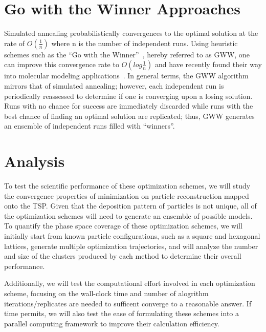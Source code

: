 \documentclass[10pt,twocolumn,notitlepage]{article}
\begin{document}
\section{Go with the Winner Approaches}
Simulated annealing probabilistically convergences to the optimal solution at the rate
 of $O(\frac{1}{n})$ where n is the number of independent runs.  
Using heuristic schemes such as the ``Go with the Winner''~\cite{Aldous1994gwt}, hereby referred to as GWW, 
one can improve this convergence rate to $O(log \frac{1}{n})$ and have recently found their way into molecular modeling applications~\cite{Peinado1997gwt}.  In general terms, the GWW algorithm mirrors that of simulated annealing; however, each independent run is periodically reassessed to determine if one is converging upon a losing solution.  Runs with 
no chance for success are immediately discarded while runs with the best chance of finding an optimal solution
are replicated; thus, GWW generates an ensemble of independent runs filled with  ``winners''.  

\section{Analysis}
To test the scientific performance of these optimization schemes, we will study the convergence properties of minimization on particle reconstruction mapped onto the TSP.  Given that the deposition pattern of particles is not unique, all of the optimization schemes will need to generate an ensemble of possible models.
To quantify the phase space coverage of these optimization schemes, we will initially start from known particle configurations, such as a square and hexagonal lattices, generate multiple optimization trajectories, and will analyze the number and size of the clusters produced by each method to determine their overall  performance.  

Additionally, we will test the computational effort involved in each optimization scheme, focusing on the wall-clock time and number of alogrithm iterations/replicates are needed to sufficent converge to a reasonable answer.  If time permits, we will also test the ease of formulating these schemes into a parallel computing framework to improve their calculation efficiency.



\end{document}
